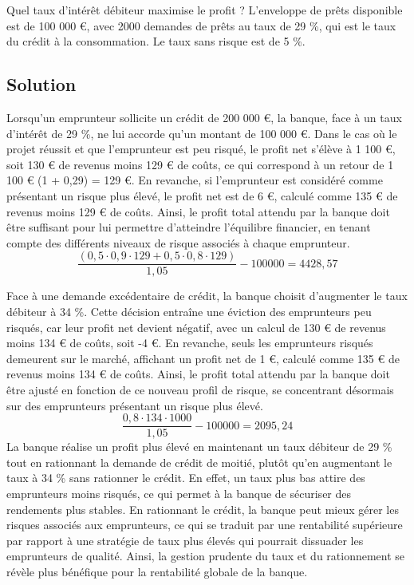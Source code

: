 \documentclass[a4paper, 12pt]{report}
\begin{document}
Quel taux d’intérêt débiteur maximise le profit ? L'enveloppe de prêts disponible est de 100 000 €, avec 2000 demandes de prêts au taux de 29 \%, qui est le taux du crédit à la consommation. Le taux sans risque est de 5 \%.

\subsection{Solution}

Lorsqu'un emprunteur sollicite un crédit de 200 000 €, la banque, face à un taux d'intérêt de 29 \%, ne lui accorde qu'un montant de 100 000 €. Dans le cas où le projet réussit et que l'emprunteur est peu risqué, le profit net s'élève à 1 100 €, soit 130 € de revenus moins 129 € de coûts, ce qui correspond à un retour de 1 100 € (1 + 0,29) = 129 €. En revanche, si l'emprunteur est considéré comme présentant un risque plus élevé, le profit net est de 6 €, calculé comme 135 € de revenus moins 129 € de coûts. Ainsi, le profit total attendu par la banque doit être suffisant pour lui permettre d'atteindre l'équilibre financier, en tenant compte des différents niveaux de risque associés à chaque emprunteur.
$$
\frac{(0,5\cdot 0,9 \cdot 129 +0,5\cdot 0,8 \cdot 129 )}{1,05}-100000=4428,57
$$

Face à une demande excédentaire de crédit, la banque choisit d'augmenter le taux débiteur à 34 \%. Cette décision entraîne une éviction des emprunteurs peu risqués, car leur profit net devient négatif, avec un calcul de 130 € de revenus moins 134 € de coûts, soit -4 €. En revanche, seuls les emprunteurs risqués demeurent sur le marché, affichant un profit net de 1 €, calculé comme 135 € de revenus moins 134 € de coûts. Ainsi, le profit total attendu par la banque doit être ajusté en fonction de ce nouveau profil de risque, se concentrant désormais sur des emprunteurs présentant un risque plus élevé.
$$
\frac{0,8\cdot134\cdot1000}{1,05}-100000=2095,24
$$
La banque réalise un profit plus élevé en maintenant un taux débiteur de 29 \% tout en rationnant la demande de crédit de moitié, plutôt qu'en augmentant le taux à 34 \% sans rationner le crédit. En effet, un taux plus bas attire des emprunteurs moins risqués, ce qui permet à la banque de sécuriser des rendements plus stables. En rationnant le crédit, la banque peut mieux gérer les risques associés aux emprunteurs, ce qui se traduit par une rentabilité supérieure par rapport à une stratégie de taux plus élevés qui pourrait dissuader les emprunteurs de qualité. Ainsi, la gestion prudente du taux et du rationnement se révèle plus bénéfique pour la rentabilité globale de la banque.
\end{document}
